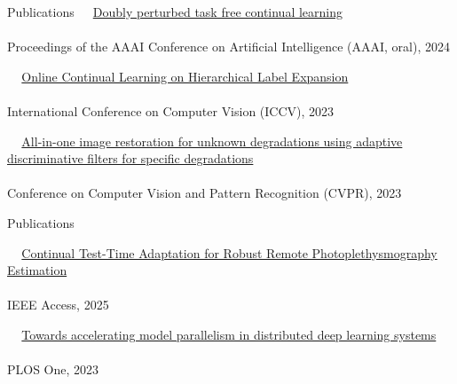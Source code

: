 \documentclass{resume} %
\begin{document}
\begin{rSection}{Publications {}}
\textbullet~\,\, \href{https://arxiv.org/abs/2312.13027}{Doubly perturbed task free continual learning}
\\ 
\\ \hspace*{1.5em}Proceedings of the AAAI Conference on Artificial Intelligence (AAAI, oral), 2024

\textbullet~\,\, \href{https://ieeexplore.ieee.org/document/10377260}{Online Continual Learning on Hierarchical Label Expansion
}
\\ 
\\ \hspace*{1.5em}International Conference on Computer Vision (ICCV), 2023


\textbullet~\,\, \href{https://ieeexplore.ieee.org/document/10204770}{All-in-one image restoration for unknown degradations using adaptive discriminative filters for specific degradations}
\\ 
\\ \hspace*{1.5em}Conference on Computer Vision and Pattern Recognition (CVPR), 2023

\end{rSection}



\begin{rSection}{Publications {}}

\textbullet~\,\, \href{https://ieeexplore.ieee.org/document/10938539}{Continual Test-Time Adaptation for Robust Remote Photoplethysmography Estimation}
\\ 
\\ \hspace*{1.5em}IEEE Access, 2025

\textbullet~\,\, \href{https://journals.plos.org/plosone/article?id=10.1371/journal.pone.0293338}{Towards accelerating model parallelism in distributed deep learning systems}
\\ 
\\ \hspace*{1.5em}PLOS One, 2023

\end{rSection} 
\end{document}
